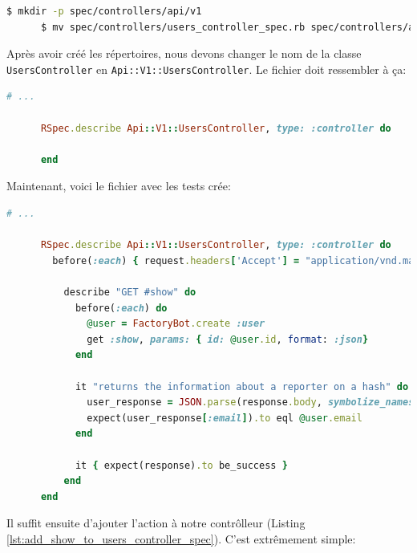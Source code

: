 \documentclass[]{report}
\begin{document}
    \begin{scriptsize}
      \begin{lstlisting}[language=bash]
      $ mkdir -p spec/controllers/api/v1
      $ mv spec/controllers/users_controller_spec.rb spec/controllers/api/v1
      \end{lstlisting}
    \end{scriptsize}

    Après avoir créé les répertoires, nous devons changer le nom de la classe \verb|UsersController| en \verb|Api::V1::UsersController|. Le fichier doit ressembler à ça:

    \begin{scriptsize}
      \begin{lstlisting}[language=ruby]
      # ...

      RSpec.describe Api::V1::UsersController, type: :controller do

      end
      \end{lstlisting}
    \end{scriptsize}

    Maintenant, voici le fichier avec les tests crée:

    \begin{scriptsize}
      \begin{lstlisting}[language=ruby, caption={Le test du contrôlleur des utilisateur  (spec/controllers/api/v1/users\_controller\_spec.rb)}, label={lst:add_show_test_to_users_controller_spec}]
      # ...

      RSpec.describe Api::V1::UsersController, type: :controller do
        before(:each) { request.headers['Accept'] = "application/vnd.marketplace.v1" }

          describe "GET #show" do
            before(:each) do
              @user = FactoryBot.create :user
              get :show, params: { id: @user.id, format: :json}
            end

            it "returns the information about a reporter on a hash" do
              user_response = JSON.parse(response.body, symbolize_names: true)
              expect(user_response[:email]).to eql @user.email
            end

            it { expect(response).to be_success }
          end
      end
      \end{lstlisting}
    \end{scriptsize}

    Il suffit ensuite d'ajouter l'action à notre contrôlleur (Listing \ref{lst:add_show_to_users_controller_spec}). C'est extrêmement simple:
\end{document}
